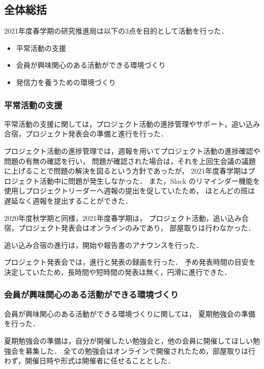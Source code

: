 \subsection*{全体総括}


2021年度春学期の研究推進局は以下の3点を目的として活動を行った．

\begin{itemize}
    \item 平常活動の支援
    \item 会員が興味関心のある活動ができる環境づくり
    \item 発信力を養うための環境づくり
\end{itemize}

\subsubsection*{平常活動の支援}
平常活動の支援に関しては，プロジェクト活動の進捗管理やサポート，追い込み合宿，プロジェクト発表会の準備と進行を行った．

プロジェクト活動の進捗管理では，週報を用いてプロジェクト活動の進捗確認や問題の有無の確認を行い，
問題が確認された場合は，それを上回生会議の議題に上げることで問題の解決を図るという方針であったが，
2021年度春学期はプロジェクト活動中に問題が発生しなかった．
また，Slack のリマインダー機能を使用しプロジェクトリーダーへ週報の提出を促していたため，
ほとんどの班は遅延なく週報を提出することができた．

2020年度秋学期と同様，2021年度春学期は，
プロジェクト活動，追い込み合宿，プロジェクト発表会はオンラインのみであり，
部屋取りは行わなかった．

追い込み合宿の進行は，開始や報告書のアナウンスを行った．

プロジェクト発表会では，進行と発表の録画を行った．
予め発表時間の目安を決定していたため，長時間や短時間の発表は無く，円滑に進行できた．

\subsubsection*{会員が興味関心のある活動ができる環境づくり}
会員が興味関心のある活動ができる環境づくりに関しては，
夏期勉強会の準備を行った．

夏期勉強会の準備は，自分が開催したい勉強会と，他の会員に開催してほしい勉強会を募集した．
全ての勉強会はオンラインで開催されたため，部屋取りは行わず，開催日時や形式は開催者に任せることとした．


